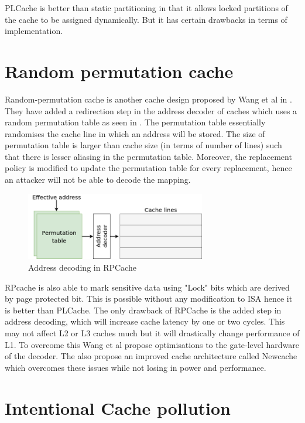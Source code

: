 PLCache is better than static partitioning in that it allows locked partitions
of the cache to be assigned dynamically.
But it has certain drawbacks in terms of implementation.

\section{Random permutation cache}

Random-permutation cache is another cache design proposed by Wang et al in
.
They have added a redirection step in the address decoder of caches which uses
a random permutation table as seen in .
The permutation table essentially randomises the cache line in which an
address will be stored.
The size of permutation table is larger than cache size (in terms of number of
lines) such that there is lesser aliasing in the permutation table. Moreover,
the replacement policy is modified to update the permutation table for every
replacement, hence an attacker will not be able to decode the mapping.

\begin{figure}
    \centering
    \includegraphics[width=0.7\textwidth]{figures/rp-cache}
    \caption{Address decoding in RPCache}
    \label{fig:rpcache}
\end{figure}

RPcache is also able to mark sensitive data using "Lock" bits which are
derived by page protected bit.
This is possible without any modification to ISA hence it is better than PLCache.
The only drawback of RPCache is the added step in address decoding, which will
increase cache latency by one or two cycles.
This may not affect L2 or L3 caches much but it will drastically change
performance of L1.
To overcome this Wang et al propose optimisations to the gate-level hardware
of the decoder.
The also propose an improved cache architecture called Newcache
 which overcomes these issues while not losing in power and
performance.

\section{Intentional Cache pollution}

